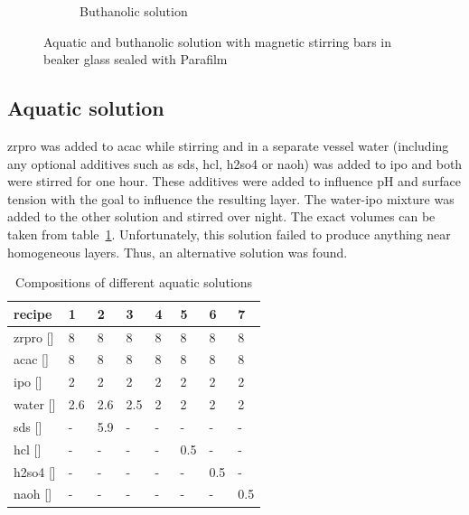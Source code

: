 \begin{figure}[htb]
\begin{subfigure}{0.49\textwidth}
		\label{fig:sol-bu}
		\caption{Buthanolic solution}
	\end{subfigure}
	\label{fig:sol}
	\caption{Aquatic and buthanolic solution with magnetic stirring bars in beaker glass sealed with Parafilm} 
\end{figure}

\subsection{Aquatic solution}\label{sec:exp-sol-aq}
\gls{zrpro} was added to \gls{acac} while stirring and in a separate vessel \gls{water} 
(including any optional additives such as \gls{sds}, \gls{hcl}, \gls{h2so4} or \gls{naoh}) 
was added to \gls{ipo} and both were stirred for one hour. 
These additives were added to influence pH and surface tension with the goal to influence the resulting layer. %
The \gls{water}-\gls{ipo} mixture was added to the other solution and stirred over night. 
The exact volumes can be taken from table~\ref{tab:rec1}.
Unfortunately, this solution failed to produce anything near homogeneous layers. 
Thus, an alternative solution was found.
\begin{table}[h]
	\centering
	\caption{Compositions of different aquatic solutions}
	\label{tab:rec1}
	\begin{tabular}{llllllll}
		\hline
		recipe				&1		&2		&3		&4		&5		&6		&7\\
		\hline
		\gls{zrpro} [\ml{}]	&8		&8		&8		&8		&8		&8		&8\\
		\gls{acac}  [\ml{}]	&8		&8		&8		&8		&8		&8		&8\\
		\gls{ipo}   [\ml{}]	&2		&2		&2		&2		&2		&2		&2\\
		\gls{water} [\ml{}]	&2.6	&2.6	&2.5	&2~		&2		&2		&2\\
		\gls{sds}   [\mg{}]	&-		&5.9	&-		&-		&-		&-		&-\\
		\gls{hcl}   [\ml{}]	&-		&-		&-		&-		&0.5	&-		&-\\
		\gls{h2so4} [\ml{}]	&-		&-		&-		&-		&-		&0.5	&-\\
		\gls{naoh}  [\ml{}] &-		&-		&-		&-		&-		&-		&0.5\\
		\hline
	\end{tabular}
\end{table}
%
